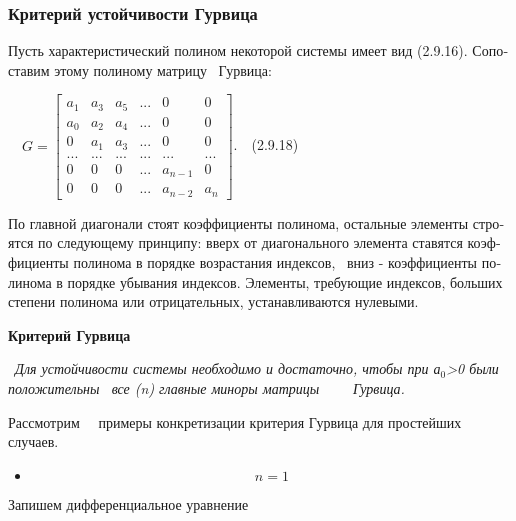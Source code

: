 \documentclass[a4paper]{article}
\newcommand\textsubscript[1]{\ensuremath{{}_{\text{#1}}}}
\newcommand\liststyleWWviiiNumlxix{%
\renewcommand\theenumi{\arabic{enumi}}
\renewcommand\theenumii{\arabic{enumii}}
\renewcommand\theenumiii{\arabic{enumiii}}
\renewcommand\labelitemi{}
\renewcommand\labelenumi{\theenumi.}
\renewcommand\labelenumii{\theenumii.}
\renewcommand\labelenumiii{\theenumiii.}
}
\begin{document}
\subsubsection{Критерий устойчивости Гурвица}
\hypertarget{RefHeadingToc455659721}{}{\begin{russian}\sffamily
Пусть характеристический полином некоторой системы имеет вид (2.9.16). Сопоставим этому полиному матрицу \ Гурвица:
\end{russian}}

{\begin{russian}\sffamily
\ \ 
$G=\left[\begin{matrix}a_1&a_3&a_5&...&0&0\\a_0&a_2&a_4&...&0&0\\0&a_1&a_3&...&0&0\\...&...&...&...&...&...\\0&0&0&...&a_{n-1}&0\\0&0&0&...&a_{n-2}&a_n\end{matrix}\right]$.\ \ (2.9.18)
\end{russian}}

{\begin{russian}\sffamily
По главной диагонали стоят коэффициенты полинома, остальные элементы строятся по следующему принципу: вверх от
диагонального элемента ставятся коэффициенты полинома в порядке возрастания индексов, \ вниз - коэффициенты полинома в
порядке убывания индексов. Элементы, требующие индексов, больших степени полинома или отрицательных, устанавливаются
нулевыми.
\end{russian}}


\bigskip


\bigskip

{\begin{russian}\sffamily\bfseries
Критерий Гурвица
\end{russian}}

{\begin{russian}\sffamily
\ \textit{Для устойчивости системы необходимо и достаточно, чтобы при а}\textit{\textsubscript{0}}\textit{>0 были
положительны \ все (n) главные миноры матрицы \ \ \ \ Гурвица.}
\end{russian}}

{\begin{russian}\sffamily
Рассмотрим \ \ примеры конкретизации критерия Гурвица для простейших случаев.
\end{russian}}

\liststyleWWviiiNumlxix
\begin{itemize}
\item \begin{equation*}
n=1
\end{equation*}
\end{itemize}
{\begin{russian}\sffamily
Запишем дифференциальное уравнение
\end{russian}}
\end{document}
